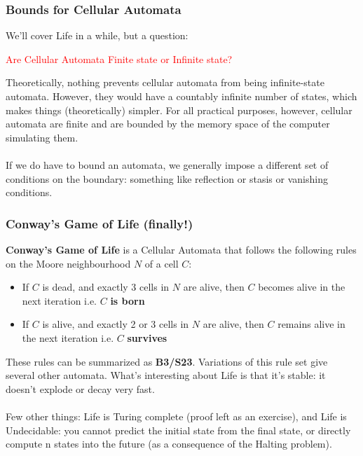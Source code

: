 \documentclass{beamer}
\begin{document}
\begin{frame}
\end{frame}

\begin{frame}
\frametitle{Bounds for Cellular Automata}
\begin{flushleft}

We'll cover Life in a while, but a question: 
\end{flushleft}
\pause
\begin{center}\begin{Large}\textcolor{red}{
Are Cellular Automata Finite state or Infinite state?}
\end{Large}\end{center}
\pause

\begin{flushleft}
Theoretically, nothing prevents cellular automata from being infinite-state
automata. However, they would have a countably infinite number of states,
which makes things (theoretically) simpler. For all practical purposes,
however, cellular automata are finite and are bounded by the memory space of
the computer simulating them. \\~\\
\pause
If we do have to bound an automata, we generally impose a different set of 
conditions on the boundary: something like reflection or stasis or vanishing
conditions.
\end{flushleft}
\end{frame}

\begin{frame}
\frametitle{Conway's Game of Life   {\tiny (finally!)}}
\begin{flushleft}
\textbf{Conway's Game of Life} is a Cellular Automata that follows the following
rules on the Moore neighbourhood $N$ of a cell $C$:
\pause
\begin{itemize}
\item{If $C$ is dead, and exactly 3 cells in $N$ are alive, then $C$ becomes
alive in the next iteration i.e. $C$ \textbf{is born}}
\pause
\item{If $C$ is alive, and exactly 2 or 3 cells in $N$ are alive, then $C$ remains 
alive in the next iteration i.e. $C$ \textbf{survives}}
\end{itemize}
\pause
These rules can be summarized as \textbf{B3/S23}. Variations of this rule set
give several other automata. What's interesting about Life is that it's stable:
it doesn't explode or decay very fast. \\~\\
\pause
Few other things: Life is Turing complete   {\tiny (proof left as an exercise)},
and Life is Undecidable: you cannot predict the initial state from the final
state, or directly compute n states into the future (as a consequence of the 
Halting problem).
\end{flushleft}
\end{frame}
\end{document}
